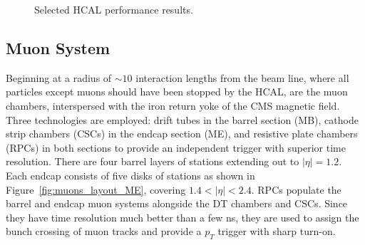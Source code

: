 \documentclass[dissertation.tex]{subfiles}
\begin{document}
\begin{figure}
	\hspace{1cm}
	\caption{Selected HCAL performance results.}
	\label{fig:HCAL_performance}
\end{figure}

\subsection{Muon System}

Beginning at a radius of $\sim10$ interaction lengths from the beam line, where all particles except muons should have been stopped by the HCAL, are the muon chambers, interspersed with the iron return yoke of the CMS magnetic field.  Three technologies are employed: drift tubes in the barrel section (MB), cathode strip chambers (CSCs) in the endcap section (ME), and resistive plate chambers (RPCs) in both sections to provide an independent trigger with superior time resolution.  There are four barrel layers of stations extending out to $|\eta| = 1.2$.  Each endcap consists of five disks of stations as shown in Figure~\ref{fig:muons_layout_ME}, covering $1.4 < |\eta| < 2.4$.  RPCs populate the barrel and endcap muon systems alongside the DT chambers and CSCs.  Since they have time resolution much better than a few ns, they are used to assign the bunch crossing of muon tracks and provide a $p_{T}$ trigger with sharp turn-on.
\end{document}
